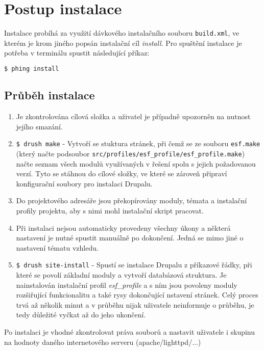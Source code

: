 \section{Postup instalace}
Instalace probíhá za využití dávkového instalačního souboru \texttt{build.xml}, ve kterém je krom jiného popsán instalační cíl \emph{install}. Pro spuštění instalace je potřeba v terminálu spustit následující příkaz:

\begin{lstlisting}[language=bash]
  $ phing install
\end{lstlisting}

\subsection*{Průběh instalace}

\begin{enumerate}
  \item Je zkontrolována cílová složka a uživatel je případně upozorněn na nutnost jejího smazání.
  \item \lstinline[language=bash]{$ drush make} - Vytvoří se stuktura stránek, při čemž se ze souboru \texttt{esf.make} (který načte podsoubor \texttt{src/profiles/esf\_profile/esf\_profile.make}) načte seznam všech modulů využívaných v řešení spolu s jejich požadovanou verzí. Tyto se stáhnou do cílové složky, ve které se zároveň připraví konfigurační soubory pro instalaci Drupalu.
  \item Do projektového adresáře jsou překopírovány moduly, témata a instalační profily projektu, aby s nimi mohl instalační skript pracovat.
  \item Při instalaci nejsou automaticky provedeny všechny úkony a některá nastavení je nutné spustit manuálně po dokončení. Jedná se mimo jiné o nastavení tématu vzhledu.
  \item \lstinline[language=bash]{$ drush site-install} - Spustí se instalace Drupalu z příkazové řádky, při které se povolí základní moduly a vytvoří databázová struktura. Je nainstalován instalační profil \emph{esf\_profile} a s ním jsou povoleny moduly rozšiřující funkcionalitu a také rysy dokončující nstavení stránek. Celý proces trvá až několik minut a v průběhu nijak uživatele neinformuje o průběhu, je tedy důležité vyčkat až do jeho ukončení.
\end{enumerate}

Po instalaci je vhodné zkontrolovat práva souborů a nastavit uživatele i skupinu na hodnoty daného internetového serveru (apache/lighttpd/...)

